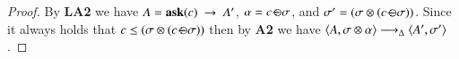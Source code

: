 \documentclass[main.tex]{subfiles}
\begin{document}
\begin{proof}
	By \textbf{LA2} we have $A = {\bf ask}(c) \ \rightarrow \ A'$, $\alpha = c \, {\ominus\hspace{-7.8pt} \div} \, \sigma$, 
	and $\sigma' = (\sigma \otimes (c \, {\ominus\hspace{-7.8pt} \div} \, \sigma))$.
	Since it always holds that $c \leq (\sigma \otimes (c \, {\ominus\hspace{-7.8pt} \div} \, \sigma))$ then by \textbf{A2}
	we have $\langle A,\sigma \otimes \alpha \rangle \stackrel{}{\longrightarrow}_\Delta \langle A',\sigma' \rangle$.
\end{proof}
\end{document}
